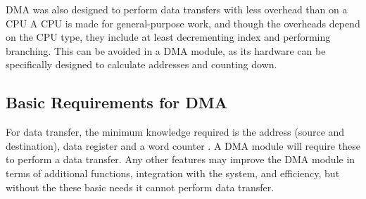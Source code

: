 DMA was also designed to perform data transfers with less overhead than on a CPU \cite{encyclopedia}
A CPU is made for general-purpose work, and though the overheads depend on the CPU type, they include at least decrementing index and performing branching.
This can be avoided in a DMA module, as its  hardware can be specifically designed to calculate addresses and counting down.

\subsection{Basic Requirements for DMA}
For data transfer, the minimum knowledge required is the address (source and destination), data register and a word counter \cite{encyclopedia}.
A DMA module will require these to perform a data transfer.
Any other features may improve the DMA module in terms of additional functions, integration with the system, and efficiency, but without the these basic needs it cannot perform data transfer.


